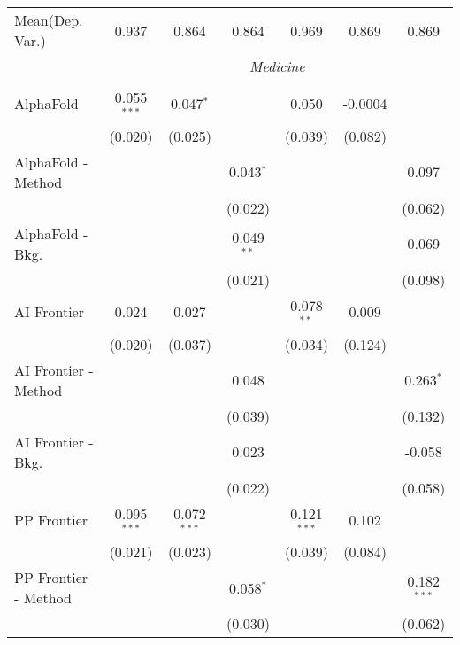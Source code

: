 \begin{tabular}{lcccccc}
Mean(Dep. Var.) & 0.937 & 0.864 & 0.864 & 0.969 & 0.869 & 0.869 \\
 & \multicolumn{6}{c}{\textit{Medicine}} \\ \\
   AlphaFold            & 0.055$^{***}$ & 0.047$^{*}$   &               & 0.050         & -0.0004 &   \\   
                        & (0.020)       & (0.025)       &               & (0.039)       & (0.082) &   \\   
   AlphaFold - Method   &               &               & 0.043$^{*}$   &               &         & 0.097\\   
                        &               &               & (0.022)       &               &         & (0.062)\\   
   AlphaFold - Bkg.     &               &               & 0.049$^{**}$  &               &         & 0.069\\   
                        &               &               & (0.021)       &               &         & (0.098)\\   
   AI Frontier          & 0.024         & 0.027         &               & 0.078$^{**}$  & 0.009   &   \\   
                        & (0.020)       & (0.037)       &               & (0.034)       & (0.124) &   \\   
   AI Frontier - Method &               &               & 0.048         &               &         & 0.263$^{*}$\\   
                        &               &               & (0.039)       &               &         & (0.132)\\   
   AI Frontier - Bkg.   &               &               & 0.023         &               &         & -0.058\\   
                        &               &               & (0.022)       &               &         & (0.058)\\   
   PP Frontier          & 0.095$^{***}$ & 0.072$^{***}$ &               & 0.121$^{***}$ & 0.102   &   \\   
                        & (0.021)       & (0.023)       &               & (0.039)       & (0.084) &   \\   
   PP Frontier - Method &               &               & 0.058$^{*}$   &               &         & 0.182$^{***}$\\   
                        &               &               & (0.030)       &               &         & (0.062)\\   

\end{tabular}
